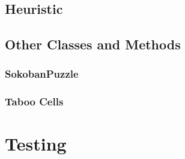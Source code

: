 \documentclass[a4paper,12pt]{article}
\begin{document}
\subsection{Heuristic}

\subsection{Other Classes and Methods}
\subsubsection{SokobanPuzzle}
\subsubsection{Taboo Cells}

\section{Testing}
\end{document}
